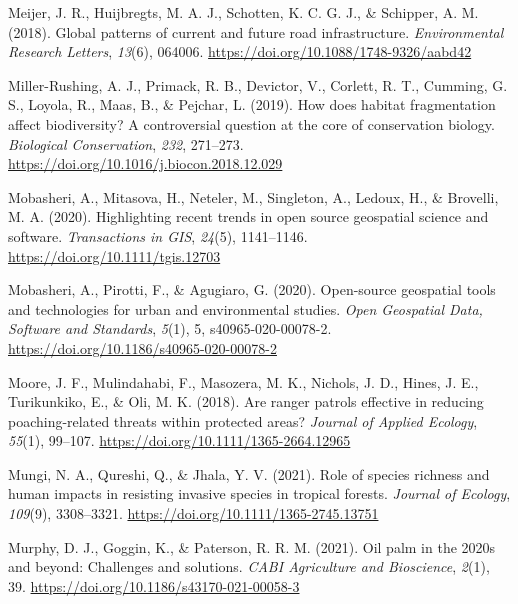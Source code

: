\documentclass[
  letterpaper,
  DIV=11,
  numbers=noendperiod]{scrreprt}
\newlength{\cslhangindent}
\newlength{\cslentryspacingunit} %
\newenvironment{CSLReferences}[2] %
 {%
  \setlength{\parindent}{0pt}
  \ifodd #1
  \let\oldpar\par
  \def\par{\hangindent=\cslhangindent\oldpar}
  \fi
  \setlength{\parskip}{#2\cslentryspacingunit}
 }%
 {}
\begin{document}
\begin{CSLReferences}{1}{0}
\leavevmode{}%
Meijer, J. R., Huijbregts, M. A. J., Schotten, K. C. G. J., \& Schipper,
A. M. (2018). Global patterns of current and future road infrastructure.
\emph{Environmental Research Letters}, \emph{13}(6), 064006.
\url{https://doi.org/10.1088/1748-9326/aabd42}

\leavevmode{}%
Miller-Rushing, A. J., Primack, R. B., Devictor, V., Corlett, R. T.,
Cumming, G. S., Loyola, R., Maas, B., \& Pejchar, L. (2019). How does
habitat fragmentation affect biodiversity? {A} controversial question at
the core of conservation biology. \emph{Biological Conservation},
\emph{232}, 271--273. \url{https://doi.org/10.1016/j.biocon.2018.12.029}

\leavevmode{}%
Mobasheri, A., Mitasova, H., Neteler, M., Singleton, A., Ledoux, H., \&
Brovelli, M. A. (2020). Highlighting recent trends in open source
geospatial science and software. \emph{Transactions in GIS},
\emph{24}(5), 1141--1146. \url{https://doi.org/10.1111/tgis.12703}

\leavevmode{}%
Mobasheri, A., Pirotti, F., \& Agugiaro, G. (2020). Open-source
geospatial tools and technologies for urban and environmental studies.
\emph{Open Geospatial Data, Software and Standards}, \emph{5}(1), 5,
s40965-020-00078-2. \url{https://doi.org/10.1186/s40965-020-00078-2}

\leavevmode{}%
Moore, J. F., Mulindahabi, F., Masozera, M. K., Nichols, J. D., Hines,
J. E., Turikunkiko, E., \& Oli, M. K. (2018). Are ranger patrols
effective in reducing poaching-related threats within protected areas?
\emph{Journal of Applied Ecology}, \emph{55}(1), 99--107.
\url{https://doi.org/10.1111/1365-2664.12965}

\leavevmode{}%
Mungi, N. A., Qureshi, Q., \& Jhala, Y. V. (2021). Role of species
richness and human impacts in resisting invasive species in tropical
forests. \emph{Journal of Ecology}, \emph{109}(9), 3308--3321.
\url{https://doi.org/10.1111/1365-2745.13751}

\leavevmode{}%
Murphy, D. J., Goggin, K., \& Paterson, R. R. M. (2021). Oil palm in the
2020s and beyond: Challenges and solutions. \emph{CABI Agriculture and
Bioscience}, \emph{2}(1), 39.
\url{https://doi.org/10.1186/s43170-021-00058-3}


\end{CSLReferences}
\end{document}
